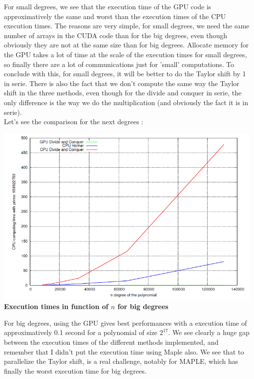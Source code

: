 For small degrees, we see that the execution time of the GPU code is approximatively the same and worst than the execution times of the CPU execution times. The reasons are very simple, for small degrees, we need the same number of arrays in the CUDA code than for the big degrees, even though obviously they are not at the same size than for big degrees. Allocate memory for the GPU takes a lot of time at the scale of the execution times for small degrees, so finally there are a lot of communications just for 'small' computations. To conclude with this, for small degrees, it will be better to do the Taylor shift by 1 in serie. There is also the fact that we don't compute the same way the Taylor shift in the three methods, even though for the divide and conquer in serie, the only difference is the way we do the multiplication (and obviously the fact it is in serie).\\

Let's see the comparison for the next degrees :\\

\begin{center}
\includegraphics[scale=0.8]{eps/time_big_n.png}
\textbf{Execution times in function of $n$ for big degrees}\\
\end{center}

For big degrees, using the GPU gives best performances with a execution time of approximatively 0.1 second for a polynomial of size $2^{17}$. We see clearly a huge gap between the execution times of the different methods implemented, and remember that I didn't put the execution time using Maple also. We see that to parallelize the Taylor shift, is a real challenge, notably for MAPLE, which has finally the worst execution time for big degrees.
